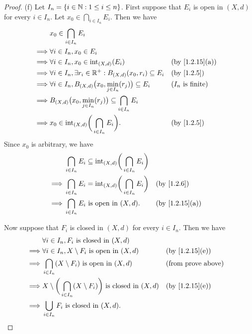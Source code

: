 \begin{proof}{(f)}
  Let \(I_n = \left\lbrace i \in \mathbb{N} : 1 \leq i \leq n\right\rbrace\).
  First suppose that \(E_i\) is open in \((X, d)\) for every \(i \in I_n\).
  Let \(x_0 \in \bigcap_{i \in I_n} E_i\).
  Then we have
  \begin{align*}
             & x_0 \in \bigcap_{i \in I_n} E_i                                                                                    \\
    \implies & \forall i \in I_n, x_0 \in E_i                                                                                     \\
    \implies & \forall i \in I_n, x_0 \in \text{int}_{(X, d)}(E_i)                              &  & \text{(by \cref{1.2.15}(a))} \\
    \implies & \forall i \in I_n, \exists r_i \in \R^+ : B_{(X, d)}(x_0, r_i) \subseteq E_i     &  & \by{1.2.5}                   \\
    \implies & \forall i \in I_n, B_{(X, d)}\big(x_0, \min_{j \in I_n}(r_j)\big) \subseteq E_i  &  & \text{(\(I_n\) is finite)}   \\
    \implies & B_{(X, d)}\big(x_0, \min_{j \in I_n}(r_j)\big) \subseteq \bigcap_{i \in I_n} E_i                                   \\
    \implies & x_0 \in \text{int}_{(X, d)}\bigg(\bigcap_{i \in I_n} E_i\bigg).                  &  & \by{1.2.5}
  \end{align*}
  Since \(x_0\) is arbitrary, we have
  \begin{align*}
             & \bigcap_{i \in I_n} E_i \subseteq \text{int}_{(X, d)}\bigg(\bigcap_{i \in I_n} E_i\bigg)                                   \\
    \implies & \bigcap_{i \in I_n} E_i = \text{int}_{(X, d)}\bigg(\bigcap_{i \in I_n} E_i\bigg)         &  & \by{1.2.6}                   \\
    \implies & \bigcap_{i \in I_n} E_i \text{ is open in } (X, d).                                      &  & \text{(by \cref{1.2.15}(a))}
  \end{align*}

  Now suppose that \(F_i\) is closed in \((X, d)\) for every \(i \in I_n\).
  Then we have
  \begin{align*}
             & \forall i \in I_n, F_i \text{ is closed in } (X, d)                                                                          \\
    \implies & \forall i \in I_n, X \setminus F_i \text{ is open in } (X, d)                              &  & \text{(by \cref{1.2.15}(e))} \\
    \implies & \bigcap_{i \in I_n} (X \setminus F_i) \text{ is open in } (X, d)                           &  & \text{(from prove above)}    \\
    \implies & X \setminus \bigg(\bigcap_{i \in I_n} (X \setminus F_i)\bigg) \text{ is closed in } (X, d) &  & \text{(by \cref{1.2.15}(e))} \\
    \implies & \bigcup_{i \in I_n} F_i \text{ is closed in } (X, d).
  \end{align*}
\end{proof}

